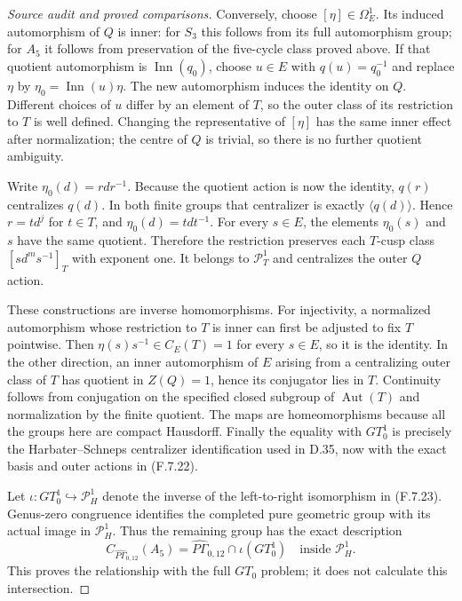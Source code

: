 \begin{proof}[Source audit and proved comparisons]
Conversely, choose $[\eta]\in\Omega_E^1$.
Its induced automorphism of $Q$ is inner: for
$S_3$ this follows from its full automorphism group;
for $A_5$ it follows from preservation of the
five-cycle class proved above.
If that quotient automorphism is $\operatorname{Inn}(q_0)$,
choose $u\in E$ with $q(u)=q_0^{-1}$ and replace
$\eta$ by $\eta_0=\operatorname{Inn}(u)\eta$.
The new automorphism induces the identity on $Q$.
Different choices of $u$ differ by an element of $T$,
so the outer class of its restriction to $T$ is
well defined.  Changing the representative of
$[\eta]$ has the same inner effect after normalization;
the centre of $Q$ is trivial, so there is no further
quotient ambiguity.

Write $\eta_0(d)=rdr^{-1}$.  Because the quotient
action is now the identity, $q(r)$ centralizes
$q(d)$.  In both finite groups that centralizer is
exactly $\langle q(d)\rangle$.  Hence $r=t d^j$
for $t\in T$, and $\eta_0(d)=tdt^{-1}$.
For every $s\in E$, the elements $\eta_0(s)$ and
$s$ have the same quotient.  Therefore the restriction
preserves each $T$-cusp class
$[s d^m s^{-1}]_T$ with exponent one.
It belongs to $\mathcal P_T^1$ and centralizes the
outer $Q$ action.

These constructions are inverse homomorphisms.
For injectivity, a normalized automorphism whose
restriction to $T$ is inner can first be adjusted
to fix $T$ pointwise.  Then
$\eta(s)s^{-1}\in C_E(T)=1$ for every $s\in E$,
so it is the identity.  In the other direction,
an inner automorphism of $E$ arising from a
centralizing outer class of $T$ has quotient in
$Z(Q)=1$, hence its conjugator lies in $T$.
Continuity follows from conjugation on the specified
closed subgroup of $\operatorname{Aut}(T)$ and
normalization by the finite quotient.  The maps
are homeomorphisms because all the groups here
are compact Hausdorff.
Finally the equality with $GT_0^1$ is precisely the
Harbater--Schneps centralizer identification used
in D.35, now with the exact basis and outer actions
in (F.7.22)\cite[Propositions 3--4 and Theorem 2]{R-HS}.

Let $\iota:GT_0^1\hookrightarrow\mathcal P_H^1$
denote the inverse of the left-to-right isomorphism
in (F.7.23).  Genus-zero congruence identifies the
completed pure geometric group with its actual
image in $\mathcal P_H^1$.  Thus the remaining group
has the exact description
\[
             C_{\widehat{P\Gamma}_{0,12}}(A_5)
                 =\widehat{P\Gamma}_{0,12}
                                \cap\iota(GT_0^1)
                 \quad\text{inside }\mathcal P_H^1.     \tag{F.7.25}
\]
This proves the relationship with the full $GT_0$
problem; it does not calculate this intersection.


\end{proof}
